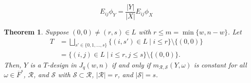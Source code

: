 \documentclass[10pt,a4paper]{amsart}
\newtheorem{theorem}{Theorem}
\begin{document}
\begin{equation} \label{eq:E_ij}
E_{ij}\phi_Y=\frac{|Y|}{|X|}E_{ij}\phi_X    
\end{equation}

\begin{theorem}\label{thm:T-design}
Suppose $(0,0)\ne (r,s) \in L$ with $r \leq m=\min\{w,n-w\}$. 
Let 
\begin{align*}
T&=\bigsqcup_{s'\in \{0,1,\ldots,s\}}\{(i,s') \in L \mid  i \leq r\}\setminus \{(0,0)\}\\    
&= \{(i,j) \in L \mid i \leq r, j\leq s\} \setminus \{(0,0)\}. 
\end{align*}
Then, $Y$ is a $T$-design in $J_q(w,n)$ if and only if 
$m_{\mathcal{R},\mathcal{S}}(Y,\omega)$ is constant for all $\omega \in \overline{F}^s$, $\mathcal{R}$, and $\mathcal{S}$ with $\mathcal{S}\subset \mathcal{R}$, $|\mathcal{R}|=r$, and $|\mathcal{S}|=s$.  
\end{theorem} 
\end{document}
